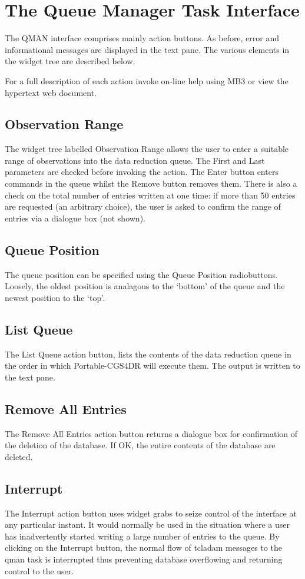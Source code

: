 \documentclass[a4paper]{book}
\renewcommand{\_}{{\tt\char'137}}
\begin{document}
\section{The Queue Manager Task Interface}
The QMAN interface comprises mainly action buttons.
As before, error and informational messages are displayed in the text pane.
The various elements in the widget tree are described below.

For a full description of each action invoke on-line help using MB3 or view the hypertext web document.

\subsection{Observation Range}
The widget tree labelled {\sf Observation Range} allows the user to enter a
suitable range of observations into the data reduction queue. The {\sf First}
and {\sf Last} parameters are checked before invoking the action. The {\sf Enter}
button enters commands in the queue whilst the {\sf Remove} button removes them.
There is also a check on the total number of entries written at one time: if
more than 50 entries are requested (an arbitrary choice), the user is asked to
confirm the range of entries via a dialogue box (not shown).

\subsection{Queue Position}
The queue position can be specified using the {\sf Queue Position} radiobuttons.
Loosely, the oldest position is analagous to the `bottom' of the queue and the
newest position to the `top'. 

\subsection{List Queue}
The {\sf List Queue} action button, lists the contents of the data reduction
queue in the order in which Portable-CGS4DR will execute them. The output is written to the text pane.

\subsection{Remove All Entries}
The {\sf Remove All Entries} action button returns a dialogue box 
for confirmation of the deletion of the database. If {\sf OK}, the entire contents of the database
are deleted.

\subsection{Interrupt}
The {\sf Interrupt} action button uses widget grabs to seize control of the interface at
any particular instant. It would normally be used in the situation where a user
has inadvertently started writing a large number of entries to the queue. By clicking
on the {\sf Interrupt} button, the normal flow of {\sc tcladam} messages to the
qman task is interrupted thus preventing database overflowing and returning control to
the user.
\end{document}
